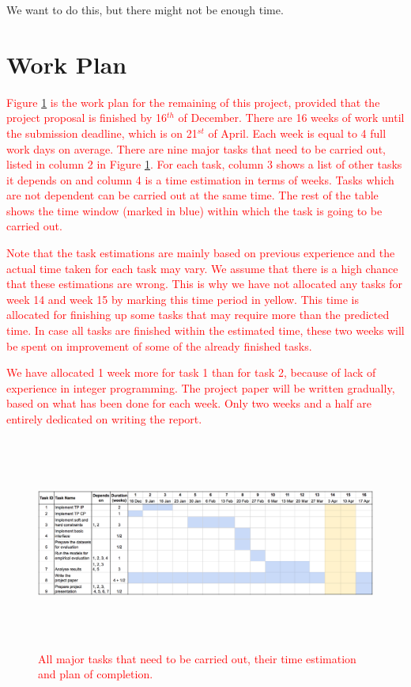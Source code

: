 \documentclass{mprop}
\theoremstyle{definition}
\begin{document}
We want to do this, but there might not be enough time.

\section{Work Plan}
\label{sec:workplan}

\textcolor{red}{
Figure \ref{fig:estimation} is the work plan for the remaining of this project, provided that the project proposal is finished by 16$^{th}$ of December. There are 16 weeks of work until the submission deadline, which is on 21$^{st}$ of April. Each week is equal to 4 full work days on average. There are nine major tasks that need to be carried out, listed in column 2 in Figure \ref{fig:estimation}. For each task, column 3 shows a list of other tasks it depends on and column 4 is a time estimation in terms of weeks. Tasks which are not dependent can be carried out at the same time. The rest of the table shows the time window (marked in blue) within which the task is going to be carried out.}

\textcolor{red}{
Note that the task estimations are mainly based on previous experience and the actual time taken for each task may vary. We assume that there is a high chance that these estimations are wrong. This is why we have not allocated any tasks for week 14 and week 15 by marking this time period in yellow. This time is allocated for finishing up some tasks that may require more than the predicted time. In case all tasks are finished within the estimated time, these two weeks will be spent on improvement of some of the already finished tasks.}

\textcolor{red}{
We have allocated 1 week more for task 1 than for task 2, because of lack of experience in integer programming. The project paper will be written gradually, based on what has been done for each week. Only two weeks and a half are entirely dedicated on writing the report.}

\begin{figure}
\centering
\caption{\textcolor{red}{All major tasks that need to be carried out, their time estimation and plan of completion.}}
\label{fig:estimation}
\includegraphics[width=18cm, height=7cm]{images/estimation.png}
\end{figure}

\clearpage


\end{document}
